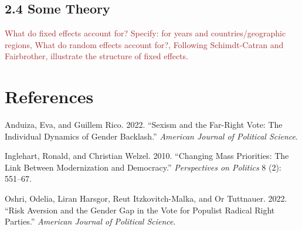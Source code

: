 \documentclass[
]{article}
\newlength{\cslhangindent}
\newlength{\cslentryspacingunit} %
\newenvironment{CSLReferences}[2] %
 {%
  \setlength{\parindent}{0pt}
  \ifodd #1
  \let\oldpar\par
  \def\par{\hangindent=\cslhangindent\oldpar}
  \fi
  \setlength{\parskip}{#2\cslentryspacingunit}
 }%
 {}
\begin{document}
\hypertarget{some-theory}{%
\subsection{2.4 Some Theory}\label{some-theory}}

\textcolor{brown}{What do fixed effects account for? Specify: for years and countries/geographic regions, What do random effects account for?, Following Schimdt-Catran and Fairbrother, illustrate the structure of fixed effects.}

\FloatBarrier

\hypertarget{references}{%
\section*{References}\label{references}}

\hypertarget{refs}{}
\begin{CSLReferences}{1}{0}
\leavevmode{}%
Anduiza, Eva, and Guillem Rico. 2022. {``Sexism and the Far-Right Vote:
The Individual Dynamics of Gender Backlash.''} \emph{American Journal of
Political Science}.

\leavevmode{}%
Inglehart, Ronald, and Christian Welzel. 2010. {``Changing Mass
Priorities: The Link Between Modernization and Democracy.''}
\emph{Perspectives on Politics} 8 (2): 551--67.

\leavevmode{}%
Oshri, Odelia, Liran Harsgor, Reut Itzkovitch-Malka, and Or Tuttnauer.
2022. {``Risk Aversion and the Gender Gap in the Vote for Populist
Radical Right Parties.''} \emph{American Journal of Political Science}.

\end{CSLReferences}
\end{document}
